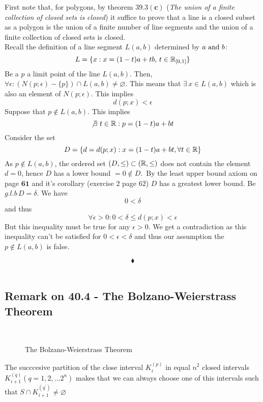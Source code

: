 First note that, for polygons, by theorem $\mathbf{39.3 (c)}$ (\textit{The
union of a finite collection of closed sets is closed}) it suffice to prove that a line is a closed subset as a polygon is the union of a finite number of line segments and the union of a finite collection of closed sets is closed.\\
Recall the definition of a line segment $L(a,b)$ determined by $a \text{ and } b$:\\
$$L=\{x:x=(1-t)a+tb,\, t\in \mathbb{R}_{[0,1]}\}$$
Be a $p$ a limit point of the line $L(a,b)$. Then, $\forall \epsilon: \left( N(p;\epsilon)-\{p\}\right)\cap L(a,b)\neq \varnothing$. This means that $\exists\, x\in L(a,b)$ which is also an element of $N(p;\epsilon)$. This implies 
$$ d(p;x)<\epsilon$$
Suppose that $p\not\in L(a,b)$. This implies
$$\not\exists\,\, t\in\mathbb{R} : p= (1-t)a+bt$$
Consider the set $$D=\{d=d(p;x):x= (1-t)a+bt,\forall t\in\mathbb{R} \}$$
As $p\not\in L(a,b)$, the ordered set $(D,\leq)\subset (\mathbb{R},\leq)$ does not contain the element $d=0$, hence $D$ has a lower bound $=0\not \in D$.\
By the least upper bound axiom on page $\mathbf{61}$ and it's corollary (exercise $2$ page $62$) $D$ has a greatest lower bound. Be $g.l.b\,  D=\delta$. We have 
$$0<\delta$$ and thus 
$$\forall\epsilon >0: 0<\delta \leq d(p;x)<\epsilon$$
But this inequality must be true for any $\epsilon>0$. We get a contradiction as this inequality can't be satisfied for $0<\epsilon <\delta$ and thus our assumption the $p\not\in L(a,b)$ is false.


$$\blacklozenge$$\\
\newpage

\subsection*{Remark on 40.4 -  The Bolzano-Weierstrass Theorem}
\begin{figure}[H]%
    \centering
\\
\caption{The Bolzano-Weierstrass Theorem}
\label{fig:fig_p8a}
\end{figure}
The succcesive partition of the close interval $K^{(p)}_i$ in equal $n^2$ closed intervals $K^{(q)}_{i+1}(q=1,2,\dots 2^n)$  makes that we can always choose one of this intervals such that $S\cap K^{(q^{'})}_{i+1}\neq \varnothing$
\newpage
\renewcommand{\thesubsection}{\thesection.\arabic{subsection}}
\setcounter{subsection}{0}



